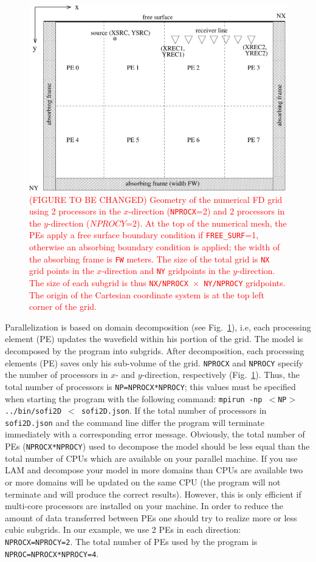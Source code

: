 \begin{figure}[ht!]
\centering
    \includegraphics[width=12cm,angle=0]{figures/grid.pdf}
    \caption{\textcolor{red}{(FIGURE TO BE CHANGED) Geometry of the numerical FD grid using 2 processors in the $x$-direction (\texttt{NPROCX}=2) and 2 processors in the $y$-direction ($NPROCY$=2). At the top of the numerical mesh, the PEs apply a free surface boundary condition if \texttt{FREE\_SURF}=1, otherwise an absorbing boundary condition is applied; the width of the absorbing frame is \texttt{FW} meters. The size of the total grid is \texttt{NX} grid points in the $x$-direction and \texttt{NY} gridpoints in the $y$-direction. The size of each subgrid is thus \texttt{NX/NPROCX $\times$ NY/NPROCY} gridpoints. The origin of the Cartesian coordinate system is at the top left corner of the grid.}}
\label{fig_grid}
\end{figure}

Parallelization is based on domain decomposition (see Fig.~\ref{fig_grid}), i.e, each processing element (PE) updates the wavefield within his portion of the grid. The model is  decomposed by the program into subgrids. After decomposition, each processing elements (PE) saves only his sub-volume of the grid. \texttt{NPROCX} and \texttt{NPROCY} specify the number of processors in $x$- and $y$-direction, respectively (Fig.~\ref{fig_grid}). Thus, the total number of processors is \texttt{NP=NPROCX*NPROCY}; this values must be specified when starting the program with the following command: \texttt{mpirun -np $<$NP$>$ ../bin/sofi2D $<$ sofi2D.json}. If the total number of processors in \texttt{sofi2D.json} and the command line differ the program will terminate immediately with a corresponding error message. Obviously, the total number of PEs (\texttt{NPROCX*NPROCY}) used to decompose the model should be less equal than the total number of CPUs which are available on your parallel machine. If you use LAM and decompose your model in more domains than CPUs are available two or more  domains will be updated on the same CPU (the program will not terminate and will produce the correct results). However, this is only efficient if multi-core processors are installed on your machine. In order to reduce the amount of data transferred between PEs one should try to realize more or less cubic subgrids. In our example, we use 2 PEs in each direction: \texttt{NPROCX=NPROCY=2}. The total number of PEs used by the program is \texttt{NPROC=NPROCX*NPROCY=4}.

